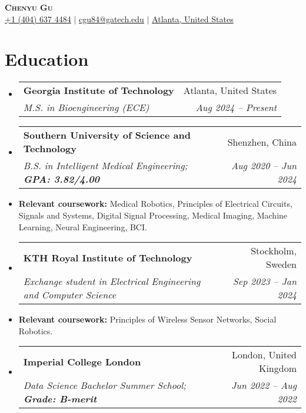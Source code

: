 \documentclass[letterpaper,11pt]{article}
\makeatletter
\newcommand{\resumeItem}[1]{
  \item\small{
    {#1 \vspace{-2pt}}
  }
}
\newcommand{\resumeSubheading}[4]{
  \vspace{-2pt}\item
  \begin{tabular*}{0.97\textwidth}[t]{l@{\extracolsep{\fill}}r}
    \textbf{#1} & #2 \\
    \textit{\small#3} & \textit{\small #4} \\
  \end{tabular*}\vspace{-7pt}
}
\newcommand{\resumeSubHeadingListStart}{\begin{itemize}[leftmargin=0.15in, label={}]}
\newcommand{\resumeSubHeadingListEnd}{\end{itemize}}
\makeatother
\begin{document}
\begin{center}
  \textbf{\Huge \scshape Chenyu Gu} \\ \vspace{3pt}
  \small
  \faMobile \hspace{.5pt} \href{tel:14046374484}{+1 (404) 637 4484}
  $|$
  \faAt \hspace{.5pt} \href{mailto:cgu84@gatech.edu}{cgu84@gatech.edu}
  $|$
  \faMapMarker \hspace{.5pt} \href{https://www.google.com/maps/place/Georgia+Institute+of+Technology/@33.7756222,-84.3988599,16z/data=!3m1!4b1}{Atlanta, United States}
\end{center}

\section{Education}
\vspace{3pt}
\resumeSubHeadingListStart

\resumeSubheading
{Georgia Institute of Technology}{Atlanta, United States}
{M.S. in Bioengineering (ECE)}{Aug 2024 -- Present}

\resumeSubheading
{Southern University of Science and Technology}{Shenzhen, China}
{B.S. in Intelligent Medical Engineering; \textbf{GPA: 3.82/4.00}}{Aug 2020 -- Jun 2024}
\resumeItem{\small \textbf{Relevant coursework:} Medical Robotics, Principles of Electrical Circuits, 
Signals and Systems, Digital Signal Processing, Medical Imaging, Machine Learning, Neural Engineering, BCI.}

\resumeSubheading
{KTH Royal Institute of Technology}{Stockholm, Sweden}
{Exchange student in Electrical Engineering and Computer Science}{Sep 2023 -- Jan 2024}
\resumeItem{\small \textbf{Relevant coursework:} Principles of Wireless Sensor Networks, Social Robotics.}

\resumeSubheading
{Imperial College London}{London, United Kingdom}
{Data Science Bachelor Summer School; \textbf{Grade: B-merit}}{Jun 2022 -- Aug 2022}

\resumeSubHeadingListEnd

\end{document}
